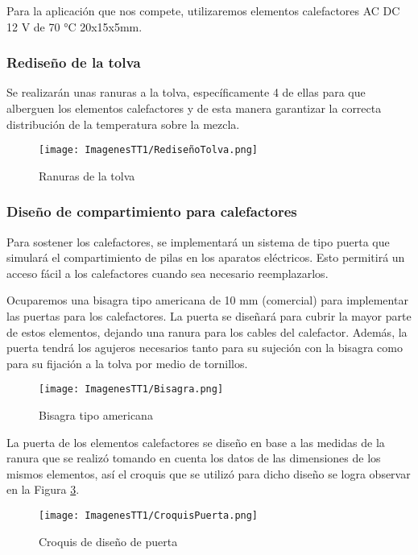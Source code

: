 \documentclass[14pt,oneside]{extarticle} %
\begin{document}
Para la aplicación que nos compete, utilizaremos elementos calefactores AC DC 12 V de 70 °C 20x15x5mm. 

\subsubsection{Rediseño de la tolva}
Se realizarán unas ranuras a la tolva, específicamente 4 de ellas para que alberguen los elementos calefactores y de esta manera garantizar la correcta distribución de la temperatura sobre la mezcla.

\begin{figure}[H]
    \centering
    \texttt{[image: ImagenesTT1/RediseñoTolva.png]}
    \caption{Ranuras de la tolva}
    \label{fig:RanurasTolva}
\end{figure}

\subsubsection{Diseño de compartimiento para calefactores}
Para sostener los calefactores, se implementará un sistema de tipo puerta que simulará el compartimiento de pilas en los aparatos eléctricos. Esto permitirá un acceso fácil a los calefactores cuando sea necesario reemplazarlos.

Ocuparemos una bisagra tipo americana de 10 mm (comercial) para implementar las puertas para los calefactores. La puerta se diseñará para cubrir la mayor parte de estos elementos, dejando una ranura para los cables del calefactor. Además, la puerta tendrá los agujeros necesarios tanto para su sujeción con la bisagra como para su fijación a la tolva por medio de tornillos.

\begin{figure}[H]
    \centering
    \texttt{[image: ImagenesTT1/Bisagra.png]}
    \caption{Bisagra tipo americana}
    \label{fig:BisagraPrecalentado}
\end{figure}

La puerta de los elementos calefactores se diseño en base a las medidas de la ranura que se realizó tomando en cuenta los datos de las dimensiones de los mismos elementos, así el croquis que se utilizó para dicho diseño se logra observar en la Figura \ref{fig:croquispuerta}.

\begin{figure}[H]
    \centering
    \texttt{[image: ImagenesTT1/CroquisPuerta.png]}
    \caption{Croquis de diseño de puerta}
    \label{fig:croquispuerta}
\end{figure}
\end{document}
